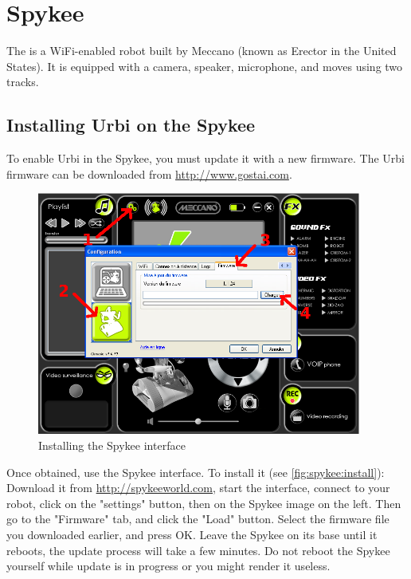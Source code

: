 
\chapter{Spykee}
\label{sec:spykee}

The  is a WiFi-enabled robot built by Meccano (known as
Erector in the United States). It is equipped with a camera, speaker,
microphone, and moves using two tracks.

\section{Installing Urbi on the Spykee}

To enable Urbi in the Spykee, you must update it with a new firmware. The Urbi
firmware can be downloaded from \url{http://www.gostai.com}.

\begin{figure}[htp]
  \centering
  \includegraphics[width=0.95\textwidth]{img/spykee-flash-instructions}
  \caption{Installing the Spykee interface}
  \label{fig:spykee:install}
\end{figure}

Once obtained, use the Spykee interface.  To install it (see
\autoref{fig:spykee:install}): Download it from
\url{http://spykeeworld.com}, start the interface, connect to your robot,
click on the "settings" button, then on the Spykee image on the left.  Then
go to the "Firmware" tab, and click the "Load" button. Select the firmware
file you downloaded earlier, and press OK. Leave the Spykee on its base
until it reboots, the update process will take a few minutes. Do not reboot
the Spykee yourself while update is in progress or you might render it
useless.

